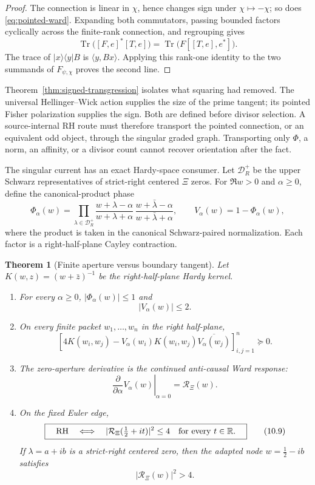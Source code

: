 \documentclass[11pt]{article}
\newtheorem{theorem}{Theorem}[section]
\theoremstyle{definition}
\theoremstyle{remark}
\newcommand{\R}{\mathbb R}
\newcommand{\cD}{\mathcal D}
\newcommand{\cR}{\mathcal R}
\begin{document}
\begin{proof}
The connection is linear in \(\chi\), hence changes sign under
\(\chi\mapsto-\chi\); so does \eqref{eq:pointed-ward}.  Expanding both commutators,
passing bounded factors cyclically across the finite-rank connection, and regrouping gives
\[
 \operatorname{Tr}\bigl([F,e]^*[T,e]\bigr)
 =\operatorname{Tr}\bigl(F[[T,e],e^*]\bigr).
\]
The trace of \(|x\rangle\langle y|B\) is \(\langle y,Bx\rangle\).  Applying this
rank-one identity to the two summands of \(F_{\psi,\chi}\) proves the second line.
\end{proof}

Theorem~\ref{thm:signed-transgression} isolates what squaring had removed.  The universal
Hellinger--Wick action supplies the size of the prime tangent; its pointed Fisher polarization
supplies the sign.  Both are defined before divisor selection.  A source-internal RH route must
therefore transport the pointed connection, or an equivalent odd object, through the singular
graded graph.  Transporting only \(\Phi\), a norm, an affinity, or a divisor count cannot recover
orientation after the fact.

The singular current has an exact Hardy-space consumer.  Let \(\cD_R^+\) be the upper
Schwarz representatives of strict-right centered \(\Xi\) zeros.  For \(\Re w>0\) and
\(\alpha\geq0\), define the canonical-product phase
\[
 \Phi_\alpha(w)=
 \prod_{\lambda\in\cD_R^+}
 \frac{w+\lambda-\alpha}{w+\lambda+\alpha}\,
 \frac{w+\bar\lambda-\alpha}{w+\bar\lambda+\alpha},
 \qquad
 V_\alpha(w)=1-\Phi_\alpha(w),
 \tag{10.5}\label{eq:ward-phase}
\]
where the product is taken in the canonical Schwarz-paired normalization.  Each factor is a
right-half-plane Cayley contraction.

\begin{theorem}[Finite aperture versus boundary tangent]\label{thm:ward-fracture}
Let \(K(w,z)=(w+\bar z)^{-1}\) be the right-half-plane Hardy kernel.
\begin{enumerate}[label=\textup{(\roman*)}]
\item For every \(\alpha\geq0\), \(|\Phi_\alpha(w)|\leq1\) and
\[
 |V_\alpha(w)|\leq2.
 \tag{10.6}\label{eq:ward-pointwise}
\]
\item On every finite packet \(w_1,\dots,w_n\) in the right half-plane,
\[
 \left[
 4K(w_i,w_j)
 -V_\alpha(w_i)K(w_i,w_j)\overline{V_\alpha(w_j)}
 \right]_{i,j=1}^n
 \succeq0.
 \tag{10.7}\label{eq:ward-four-unit-pick}
\]
\item The zero-aperture derivative is the continued anti-causal Ward response:
\[
 \left.\frac{\partial}{\partial\alpha}V_\alpha(w)\right|_{\alpha=0}
 =\cR_\Xi(w).
 \tag{10.8}\label{eq:ward-derivative}
\]
\item On the fixed Euler edge,
\[
 \boxed{\quad
 \text{\rm RH}
 \quad\Longleftrightarrow\quad
 |\cR_\Xi(\tfrac12+it)|^2\leq4
 \quad\text{for every }t\in\R.
 \quad}
 \tag{10.9}\label{eq:ward-rh-consumer}
\]
If \(\lambda=a+ib\) is a strict-right centered zero, then the adapted node
\(w=\tfrac12-ib\) satisfies
\[
 |\cR_\Xi(w)|^2>4.
 \tag{10.10}\label{eq:ward-adapted-violation}
\]
\end{enumerate}
\end{theorem}
\end{document}
